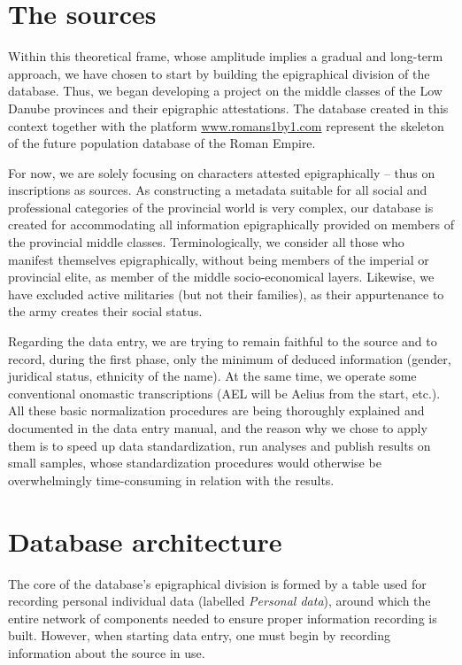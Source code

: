 \documentclass[amsthm,ebook]{saparticle}
\begin{document}
\section{The sources}

\noindent Within this theoretical frame, whose amplitude implies a gradual and long-term approach, we have chosen to start by
building the epigraphical division of the database. Thus, we began developing a project on the middle classes of the
Low Danube provinces and their epigraphic attestations. The database created in this context together with the platform
\url{www.romans1by1.com} represent the skeleton of the future population database of the Roman Empire.

For now, we are solely focusing on characters attested epigraphically – thus on inscriptions as sources. As constructing
a metadata suitable for all social and professional categories of the provincial world is very complex, our database is
created for accommodating all information epigraphically provided on members of the provincial middle classes.
Terminologically, we consider all those who manifest themselves epigraphically, without being members of the imperial
or provincial elite, as member of the middle socio-economical layers. Likewise, we have excluded active militaries (but
not their families), as their appurtenance to the army creates their social status.

Regarding the data entry, we are trying to remain faithful to the source and to record, during the first phase, only the
minimum of deduced information (gender, juridical status, ethnicity of the name). At the same time, we operate some
conventional onomastic transcriptions (AEL will be Aelius from the start, etc.). All these basic normalization
procedures are being thoroughly explained and documented in the data entry manual, and the reason why we chose to apply
them is to speed up data standardization, run analyses and publish results on small samples, whose standardization
procedures would otherwise be overwhelmingly time-consuming in relation with the results.

\section{Database architecture}

\noindent The core of the database’s epigraphical division is formed by a table used for recording personal
individual data (labelled \emph{Personal data}), around which the entire network of components needed to ensure proper
information recording is built. However, when starting data entry, one must begin by recording information about the
source in use.
\end{document}
